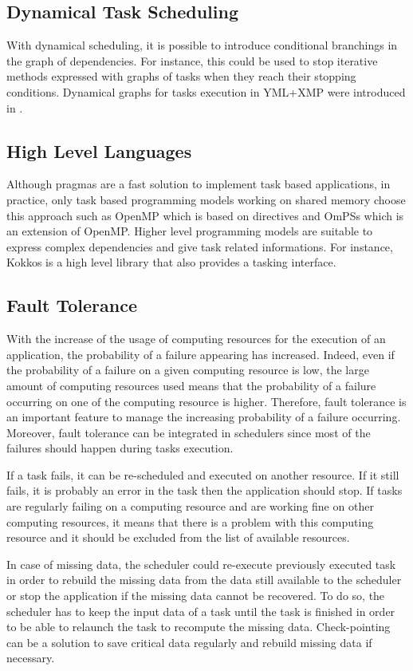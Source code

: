 \subsection{Dynamical Task Scheduling}
With dynamical scheduling, it is possible to introduce conditional branchings in the graph of dependencies.
For instance, this could be used to stop iterative methods expressed with graphs of tasks when they reach their stopping conditions.
Dynamical graphs for tasks execution in YML+XMP were introduced in \cite{Wu2019}.


\subsection{High Level Languages}
Although pragmas are a fast solution to implement task based applications, in practice, only task based programming models working on shared memory choose this approach such as OpenMP which is based on directives and OmPSs which is an extension of OpenMP.
Higher level programming models are suitable to express complex dependencies and give task related informations.
For instance, Kokkos is a high level library that also provides a tasking interface.

\subsection{Fault Tolerance}
With the increase of the usage of computing resources for the execution of an application, the probability of a failure appearing has increased.
Indeed, even if the probability of a failure on a given computing resource is low, the large amount of computing resources used means that the probability of a failure occurring on one of the computing resource is higher.
Therefore, fault tolerance is an important feature to manage the increasing probability of a failure occurring.
Moreover, fault tolerance can be integrated in schedulers since most of the failures should happen during tasks execution.

If a task fails, it can be re-scheduled and executed on another resource.
If it still fails, it is probably an error in the task then the application should stop.
If tasks are regularly failing on a computing resource and are working fine on other computing resources, it means that there is a problem with this computing resource and it should be excluded from the list of available resources.

In case of missing data, the scheduler could re-execute previously executed task in order to rebuild the missing data from the data still available to the scheduler or stop the application if the missing data cannot be recovered.
To do so, the scheduler has to keep the input data of a task until the task is finished in order to be able to relaunch the task to recompute the missing data.
Check-pointing can be a solution to save critical data regularly and rebuild missing data if necessary.

